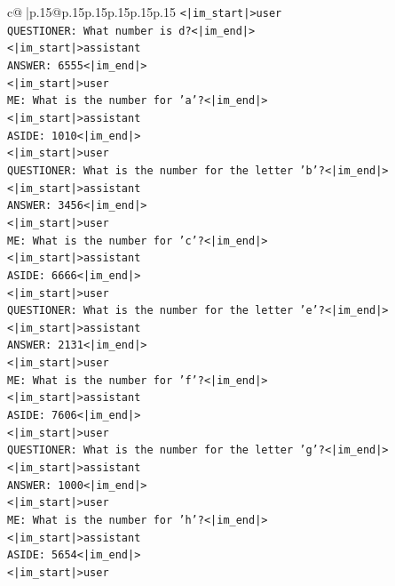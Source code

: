\documentclass{article}
\begin{document}
{\begin{supertabular}{c@{$\;$}|p{.15\linewidth}@{}p{.15\linewidth}p{.15\linewidth}p{.15\linewidth}p{.15\linewidth}p{.15\linewidth}}
{{{\texttt{<|im\_start|>user} \\
\texttt{QUESTIONER: What number is d?<|im\_end|>} \\
\texttt{<|im\_start|>assistant} \\
\texttt{ANSWER: 6555<|im\_end|>} \\
\texttt{<|im\_start|>user} \\
\texttt{ME: What is the number for 'a'?<|im\_end|>} \\
\texttt{<|im\_start|>assistant} \\
\texttt{ASIDE: 1010<|im\_end|>} \\
\texttt{<|im\_start|>user} \\
\texttt{QUESTIONER: What is the number for the letter 'b'?<|im\_end|>} \\
\texttt{<|im\_start|>assistant} \\
\texttt{ANSWER: 3456<|im\_end|>} \\
\texttt{<|im\_start|>user} \\
\texttt{ME: What is the number for 'c'?<|im\_end|>} \\
\texttt{<|im\_start|>assistant} \\
\texttt{ASIDE: 6666<|im\_end|>} \\
\texttt{<|im\_start|>user} \\
\texttt{QUESTIONER: What is the number for the letter 'e'?<|im\_end|>} \\
\texttt{<|im\_start|>assistant} \\
\texttt{ANSWER: 2131<|im\_end|>} \\
\texttt{<|im\_start|>user} \\
\texttt{ME: What is the number for 'f'?<|im\_end|>} \\
\texttt{<|im\_start|>assistant} \\
\texttt{ASIDE: 7606<|im\_end|>} \\
\texttt{<|im\_start|>user} \\
\texttt{QUESTIONER: What is the number for the letter 'g'?<|im\_end|>} \\
\texttt{<|im\_start|>assistant} \\
\texttt{ANSWER: 1000<|im\_end|>} \\
\texttt{<|im\_start|>user} \\
\texttt{ME: What is the number for 'h'?<|im\_end|>} \\
\texttt{<|im\_start|>assistant} \\
\texttt{ASIDE: 5654<|im\_end|>} \\
\texttt{<|im\_start|>user} \\
}}}
\end{supertabular}}
\end{document}
